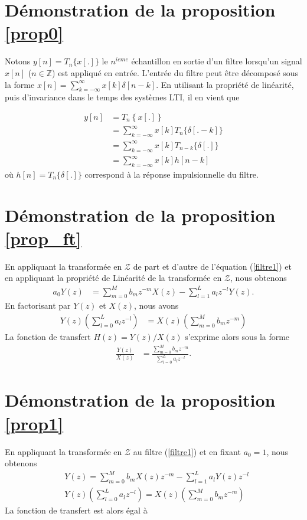\documentclass[11pt,a4paper]{IEEEtran}
\begin{document}
\section{Démonstration de la proposition \ref{prop0}}
\label{dprop0}

Notons $y[n]=T_n\{x[.]\}$ le $n^{ieme}$ échantillon en sortie d'un filtre lorsqu'un signal $x[n]$ ($n\in \mathbb{Z}$) est appliqué en entrée. L'entrée du filtre peut être décomposé sous la forme $x[n]=\sum_{k=-\infty}^{\infty} x[k] \delta[n-k]$. En utilisant la propriété de linéarité, puis d'invariance dans le temps des systèmes LTI, il en vient que

\begin{align}
y[n]&=T_n\left\{x[.]\right\}\\
&=\sum_{k=-\infty}^{\infty} x[k] T_{n}\{\delta[.-k]\}\\
&=\sum_{k=-\infty}^{\infty} x[k] T_{n-k}\{\delta[.]\}\\
&=\sum_{k=-\infty}^{\infty} x[k] h[n-k]
\end{align}
où $h[n]=T_n\{\delta[.]\}$ correspond à la réponse impulsionnelle du filtre.

\section{Démonstration de la proposition \ref{prop_ft}}
\label{dprop_ft}

En appliquant la transformée en $\mathcal{Z}$ de part et d'autre de l'équation (\ref{filtre1}) et en appliquant la propriété de Linéarité de la transformée en $\mathcal{Z}$, nous obtenons
 \begin{align*}
 a_0Y(z)&=\sum_{m=0}^{M}b_m z^{-m} X(z) -\sum_{l=1}^{L}a_l z^{-l}Y(z).
  \end{align*}
 En factorisant par $Y(z)$ et $X(z)$, nous avons
  \begin{align*}
 Y(z)\left(\sum_{l=0}^{L}a_l z^{-l}\right)&=X(z)\left(\sum_{m=0}^{M}b_m z^{-m}\right)
   \end{align*}
 La fonction de transfert $H(z)=Y(z)/X(z)$ s'exprime alors sous la forme
  \begin{align*}
 \frac{Y(z)}{X(z)}&=\frac{\sum_{m=0}^{M}b_m z^{-m}}{\sum_{l=0}^{L}a_l z^{-l}}.
 \end{align*}
 
\section{Démonstration de la proposition \ref{prop1}}
\label{dprop1}
En appliquant la transformée en $\mathcal{Z}$ au filtre (\ref{filtre1}) et en fixant $a_0=1$, nous obtenons 
\begin{align*}
&Y(z)=\sum_{m=0}^{M}b_m X(z)z^{-m}-\sum_{l=1}^{L}a_l Y(z)z^{-l}\\
&Y(z)\left(\sum_{l=0}^{L}a_l z^{-l}\right)=X(z) \left(\sum_{m=0}^{M}b_m z^{-m}\right)
\end{align*}
La fonction de transfert est alors égal à 
\end{document}
